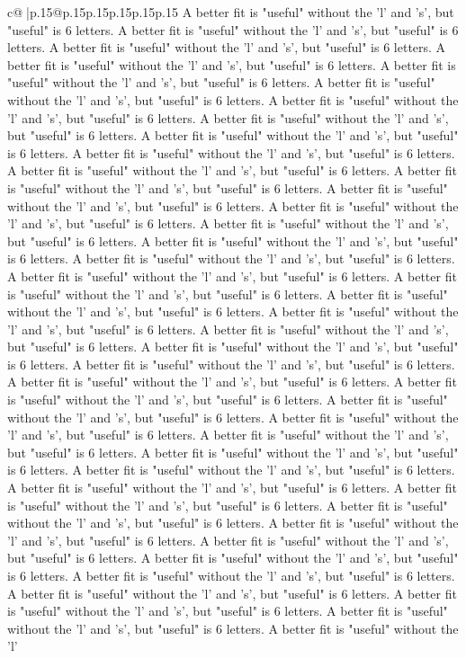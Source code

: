 \documentclass{article}
\begin{document}
{\begin{supertabular}{c@{$\;$}|p{.15\linewidth}@{}p{.15\linewidth}p{.15\linewidth}p{.15\linewidth}p{.15\linewidth}p{.15\linewidth}}
{{{A better fit is "useful" without the 'l' and 's', but "useful" is 6 letters. A better fit is "useful" without the 'l' and 's', but "useful" is 6 letters. A better fit is "useful" without the 'l' and 's', but "useful" is 6 letters. A better fit is "useful" without the 'l' and 's', but "useful" is 6 letters. A better fit is "useful" without the 'l' and 's', but "useful" is 6 letters. A better fit is "useful" without the 'l' and 's', but "useful" is 6 letters. A better fit is "useful" without the 'l' and 's', but "useful" is 6 letters. A better fit is "useful" without the 'l' and 's', but "useful" is 6 letters. A better fit is "useful" without the 'l' and 's', but "useful" is 6 letters. A better fit is "useful" without the 'l' and 's', but "useful" is 6 letters. A better fit is "useful" without the 'l' and 's', but "useful" is 6 letters. A better fit is "useful" without the 'l' and 's', but "useful" is 6 letters. A better fit is "useful" without the 'l' and 's', but "useful" is 6 letters. A better fit is "useful" without the 'l' and 's', but "useful" is 6 letters. A better fit is "useful" without the 'l' and 's', but "useful" is 6 letters. A better fit is "useful" without the 'l' and 's', but "useful" is 6 letters. A better fit is "useful" without the 'l' and 's', but "useful" is 6 letters. A better fit is "useful" without the 'l' and 's', but "useful" is 6 letters. A better fit is "useful" without the 'l' and 's', but "useful" is 6 letters. A better fit is "useful" without the 'l' and 's', but "useful" is 6 letters. A better fit is "useful" without the 'l' and 's', but "useful" is 6 letters. A better fit is "useful" without the 'l' and 's', but "useful" is 6 letters. A better fit is "useful" without the 'l' and 's', but "useful" is 6 letters. A better fit is "useful" without the 'l' and 's', but "useful" is 6 letters. A better fit is "useful" without the 'l' and 's', but "useful" is 6 letters. A better fit is "useful" without the 'l' and 's', but "useful" is 6 letters. A better fit is "useful" without the 'l' and 's', but "useful" is 6 letters. A better fit is "useful" without the 'l' and 's', but "useful" is 6 letters. A better fit is "useful" without the 'l' and 's', but "useful" is 6 letters. A better fit is "useful" without the 'l' and 's', but "useful" is 6 letters. A better fit is "useful" without the 'l' and 's', but "useful" is 6 letters. A better fit is "useful" without the 'l' and 's', but "useful" is 6 letters. A better fit is "useful" without the 'l' and 's', but "useful" is 6 letters. A better fit is "useful" without the 'l' and 's', but "useful" is 6 letters. A better fit is "useful" without the 'l' and 's', but "useful" is 6 letters. A better fit is "useful" without the 'l' and 's', but "useful" is 6 letters. A better fit is "useful" without the 'l' and 's', but "useful" is 6 letters. A better fit is "useful" without the 'l' and 's', but "useful" is 6 letters. A better fit is "useful" without the 'l' and 's', but "useful" is 6 letters. A better fit is "useful" without the 'l' and 's', but "useful" is 6 letters. A better fit is "useful" without the 'l' and 's', but "useful" is 6 letters. A better fit is "useful" without the 'l' }}}
\end{supertabular}}
\end{document}
